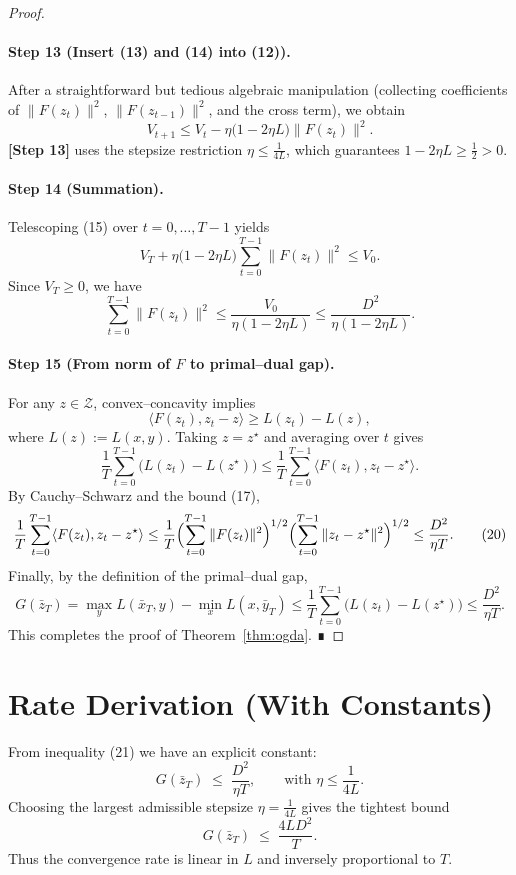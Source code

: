 \documentclass{article}
\begin{document}
\begin{proof}
\paragraph{Step 13 (Insert (13) and (14) into (12)).}
After a straightforward but tedious algebraic manipulation (collecting coefficients of $\|F(z_t)\|^2$, $\|F(z_{t-1})\|^2$, and the cross term), we obtain
\[
V_{t+1}\le V_t- \eta\bigl(1-2\eta L\bigr)\|F(z_t)\|^2 .
\tag{15}
\]
\textbf{[Step 13]} uses the stepsize restriction $\eta\le\frac{1}{4L}$, which guarantees $1-2\eta L\ge\frac12>0$.

\paragraph{Step 14 (Summation).}
Telescoping (15) over $t=0,\dots,T-1$ yields
\[
V_T +\eta\bigl(1-2\eta L\bigr)\sum_{t=0}^{T-1}\|F(z_t)\|^2
\le V_0 .
\tag{16}
\]
Since $V_T\ge0$, we have
\[
\sum_{t=0}^{T-1}\|F(z_t)\|^2\le\frac{V_0}{\eta(1-2\eta L)}\le\frac{D^2}{\eta(1-2\eta L)} .
\tag{17}
\]

\paragraph{Step 15 (From norm of $F$ to primal–dual gap).}
For any $z\in\mathcal{Z}$, convex–concavity implies
\[
\langle F(z_t),z_t-z\rangle\ge L(z_t)-L(z),
\tag{18}
\]
where $L(z):=L(x,y)$. Taking $z=z^\star$ and averaging over $t$ gives
\[
\frac1T\sum_{t=0}^{T-1}\bigl(L(z_t)-L(z^\star)\bigr)
\le\frac1T\sum_{t=0}^{T-1}\langle F(z_t),z_t-z^\star\rangle .
\tag{19}
\]
By Cauchy–Schwarz and the bound (17),
\[
\frac1T\sum_{t=0}^{T-1}\langle F(z_t),z_t-z^\star\rangle
\le\frac1T\Bigl(\sum_{t=0}^{T-1}\|F(z_t)\|^2\Bigr)^{1/2}
\Bigl(\sum_{t=0}^{T-1}\|z_t-z^\star\|^2\Bigr)^{1/2}
\le\frac{D^2}{\eta T}.
\tag{20}
\]
Finally, by the definition of the primal–dual gap,
\[
G(\bar z_T)=\max_{y}L(\bar x_T,y)-\min_{x}L(x,\bar y_T)
\le\frac1T\sum_{t=0}^{T-1}\bigl(L(z_t)-L(z^\star)\bigr)
\le\frac{D^2}{\eta T}.
\tag{21}
\]
This completes the proof of Theorem~\ref{thm:ogda}. ∎
\end{proof}

\section*{Rate Derivation (With Constants)}
From inequality (21) we have an explicit constant:
\[
G(\bar z_T)\;\le\;\frac{D^2}{\eta T},
\qquad\text{with }\eta\le\frac{1}{4L}.
\]
Choosing the largest admissible stepsize $\eta=\frac{1}{4L}$ gives the tightest bound
\[
G(\bar z_T)\;\le\;\frac{4L D^2}{T}.
\]
Thus the convergence rate is linear in $L$ and inversely proportional to $T$.
\end{document}
